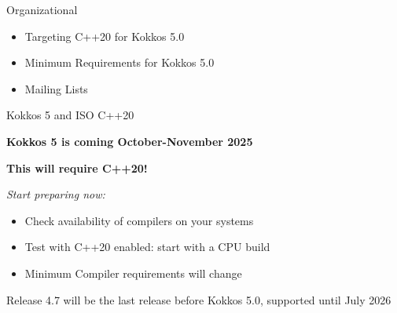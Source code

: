 

\begin{frame}[fragile]

  {\Huge Organizational}

  \vspace{15pt}

  \begin{itemize}
    \item Targeting C++20 for Kokkos 5.0
    \item Minimum Requirements for Kokkos 5.0
    \item Mailing Lists
  \end{itemize}

\end{frame}


\begin{frame}[fragile]{Kokkos 5 and ISO C++20}
\begin{center}
\textbf{Kokkos 5 is coming October-November 2025}

\vspace{0.5cm}
\textbf{This will require C++20!}
\end{center}

\textit{Start preparing now:}
\begin{itemize}
  \item{Check availability of compilers on your systems}
  \item{Test with C++20 enabled: start with a CPU build}
  \item{Minimum Compiler requirements will change}
\end{itemize}

\vspace{0.5cm}

Release 4.7 will be the last release before Kokkos 5.0, supported until July 2026

\end{frame}


